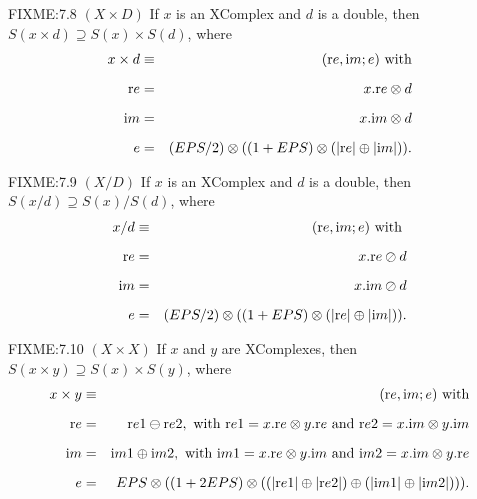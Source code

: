 \begin{definition}
\begin{proposition}{FIXME:7.8 $(X  \times  D)$} 
If $x$ is an {\textrm XComplex} and $d$ is a double{\textrm ,} then 
$S(x \times d) \supseteq S(x) \times S(d)${\textrm ,} where
\begin{eqnarray*}
x \times d &\equiv& ({\mathrm re},{\mathrm im};e) \hbox{ with}\\[6pt] {\mathrm re} &= &x.{\mathrm re} \otimes d\\[6pt] {\mathrm im} &= &x.{\mathrm im} \otimes d\\[6pt] e &=& (EPS/2) \otimes ((1 + EPS) \otimes (|{\mathrm re}| \oplus |{\mathrm im}|) ). \end{eqnarray*}
\end{proposition}

\begin{proposition}{FIXME:7.9 $(X / D)$} 
If $x$ is an {\textrm XComplex} and $d$ is a double{\textrm ,} then 
$S(x / d) \supseteq S(x) / S(d)${\textrm ,} where
\begin{eqnarray*}
x / d& \equiv& ({\mathrm re},{\mathrm im};e) \hbox{ with }\\[6pt] {\mathrm re}& =& x.{\mathrm re} \oslash d\\[6pt] {\mathrm im} &= &x.{\mathrm im} \oslash d\\[6pt] e& = &(EPS/2) \otimes ((1 + EPS) \otimes (|{\mathrm re}| \oplus |{\mathrm im}|) ).
\end{eqnarray*}

\begin{proposition}{FIXME:7.10 $(X  \times  X)$}
If $x$ and $y$ are {\textrm XComplexes,} then 
$S(x \times y) \supseteq S(x) \times S(y)${\textrm ,} where
\begin{eqnarray*}
x \times y &\equiv& ({\mathrm re},{\mathrm im};e)\hbox{ with}\\[6pt] {\mathrm re}& =&{\mathrm  re}1 \ominus {\mathrm re2}, \hbox{ with ${\mathrm re1} = x.{\mathrm re} \otimes y.{\mathrm re}$ and ${\mathrm re}2 =
x.{\mathrm im} \otimes y.{\mathrm im}$} \\[6pt] {\mathrm im}& =& {\mathrm im}1 \oplus {\mathrm im}2, \hbox{ with ${\mathrm im}1 = x.{\mathrm re} \otimes y.{\mathrm im}$ and ${\mathrm im}2 = x.{\mathrm im} \otimes
y.{\mathrm re}$}\\[6pt] e& =& EPS \otimes ((1 + 2EPS) \otimes  ((|{\mathrm re}1| \oplus |{\mathrm re}2|) \oplus  (|{\mathrm im}1| \oplus |{\mathrm im}2|))).
\end{eqnarray*}
\end{proposition}


\end{proposition}
\end{definition}
